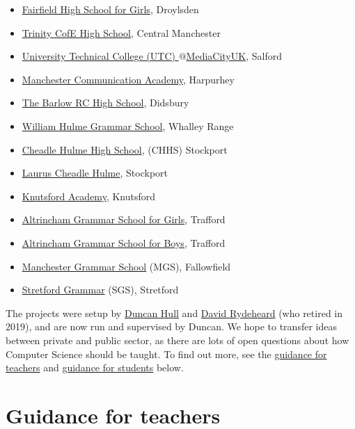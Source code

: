 \documentclass[
  12pt,
]{book}
\providecommand{\tightlist}{%
  \setlength{\itemsep}{0pt}\setlength{\parskip}{0pt}}
\begin{document}
\begin{itemize}
\tightlist
\item
  \href{http://www.fairfieldhigh.tameside.sch.uk/}{Fairfield High School for Girls}, Droylsden
\item
  \href{https://www.trinityhigh.com}{Trinity CofE High School}, Central Manchester
\item
  \href{http://www.utcmediacityuk.org.uk/}{University Technical College (UTC) \(@\)MediaCityUK}, Salford
\item
  \href{https://www.manchestercommunicationacademy.com/}{Manchester Communication Academy}, Harpurhey\\
\item
  \href{https://thebarlowrchigh.co.uk/}{The Barlow RC High School}, Didsbury
\item
  \href{https://www.whgs-academy.org/}{William Hulme Grammar School}, Whalley Range
\item
  \href{https://www.chhs.org.uk/}{Cheadle Hulme High School}, (CHHS) Stockport
\item
  \href{https://www.lauruscheadlehulme.org.uk/}{Laurus Cheadle Hulme}, Stockport
\item
  \href{https://www.knutsfordacademy.org.uk/}{Knutsford Academy}, Knutsford
\item
  \href{http://www.aggs.trafford.sch.uk/}{Altrincham Grammar School for Girls}, Trafford
\item
  \href{https://www.agsb.co.uk/}{Altrincham Grammar School for Boys}, Trafford
\item
  \href{https://www.mgs.org/}{Manchester Grammar School} (MGS), Fallowfield
\item
  \href{https://www.stretfordgrammar.com/}{Stretford Grammar} (SGS), Stretford
\end{itemize}

The projects were setup by \protect\hyperlink{contact}{Duncan Hull} and \href{http://www.cs.man.ac.uk/~david/}{David Rydeheard} (who retired in 2019), and are now run and supervised by Duncan. We hope to transfer ideas between private and public sector, as there are lots of open questions about how Computer Science should be taught. \citep{cse, suemcr, stephenson, fincherpetre} To find out more, see the \protect\hyperlink{guidance-for-teachers}{guidance for teachers} and \protect\hyperlink{guidance-for-students}{guidance for students} below.

\hypertarget{guidance-for-teachers}{%
\section{Guidance for teachers}\label{guidance-for-teachers}}
\end{document}
